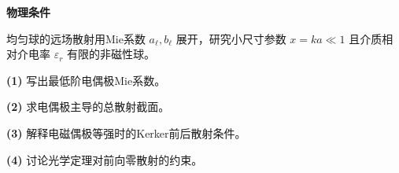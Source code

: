 \textbf{物理条件}\par 均匀球的远场散射用Mie系数 \(a_\ell,b_\ell\) 展开，研究小尺寸参数 \(x=ka\ll1\) 且介质相对介电率 \(\varepsilon_r\) 有限的非磁性球。
\par\noindent\textbf{(1)} 写出最低阶电偶极Mie系数。
\par\noindent\textbf{(2)} 求电偶极主导的总散射截面。
\par\noindent\textbf{(3)} 解释电磁偶极等强时的Kerker前后散射条件。
\par\noindent\textbf{(4)} 讨论光学定理对前向零散射的约束。
